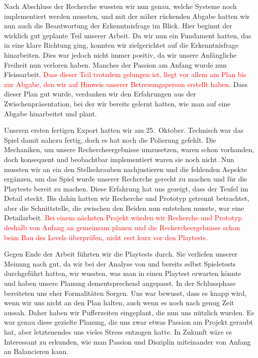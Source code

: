 \documentclass[../Main.tex]{subfiles}
\begin{document}
Nach Abschluss der Recherche wussten wir nun genau, welche Systeme noch implementiert werden mussten, und mit der näher rückenden Abgabe hatten wir nun auch die Beantwortung der Erkenntnisfrage im Blick. Hier beginnt der wirklich gut geplante Teil unserer Arbeit. Da wir nun ein Fundament hatten, das in eine klare Richtung ging, konnten wir zielgerichtet auf die Erkenntnisfrage hinarbeiten. Dies war jedoch nicht immer positiv, da wir unsere Anfängliche Freiheit nun verloren haben. Manches der Passion am Anfang wurde nun Fleissarbeit. \textcolor{red}{Dass dieser Teil trotzdem gelungen ist, liegt vor allem am Plan bis zur Abgabe, den wir auf Hinweis unserer Betreuungsperson erstellt haben.} Dass dieser Plan gut wurde, verdanken wir den Erfahrungen aus der Zwischenpräsentation, bei der wir bereits gelernt hatten, wie man auf eine Abgabe hinarbeitet und plant.

Unseren ersten fertigen Export hatten wir am 25.~Oktober. Technisch war das Spiel damit nahezu fertig, doch es hat noch die Polierung gefehlt. Die Mechaniken, um unsere Rechercheergebnisse umzusetzen, waren schon vorhanden, doch konsequent und beobachtbar implementiert waren sie noch nicht. Nun mussten wir an ein den Stellschrauben nachjustieren und die fehlenden Aspekte ergänzen, um das Spiel wurde unserer Recherche gerecht zu machen und für die Playtests bereit zu machen. Diese Erfahrung hat uns gezeigt, dass der Teufel im Detail steckt. Bis dahin hatten wir Recherche und Prototyp getrennt betrachtet, aber die Schnittstelle, die zwischen den Beiden nun entstehen musste, war eine Detailarbeit. \textcolor{red}{Bei einem nächsten Projekt würden wir Recherche und Prototyp deshalb von Anfang an gemeinsam planen und die Rechercheergebnisse schon beim Bau des Levels überprüfen, nicht erst kurz vor den Playtests.}

Gegen Ende der Arbeit führten wir die Playtests durch. Sie verliefen unserer Meinung nach gut, da wir bei der Analyse von  und  bereits selbst Spieletests durchgeführt hatten, wir wussten, was man in einen Playtest erwarten könnte und haben unsere Planung dementsprechend angepasst. In der Schlussphase bereiteten uns eher Formalitäten Sorgen. Uns war bewusst, dass es knapp wird, wenn wir uns nicht an den Plan halten, auch wenn es noch nach genug Zeit aussah. Daher haben wir Pufferzeiten eingeplant, die nun uns nützlich wurden. Es war genau diese gezielte Planung, die uns zwar etwas Passion am Projekt geraubt hat, aber letztenendes uns vieles Stress entzogen hatte. In Zukunft wäre es Interessant zu erkunden, wie man Passion und Disziplin miteinander von Anfang an Balancieren kann.
\end{document}
